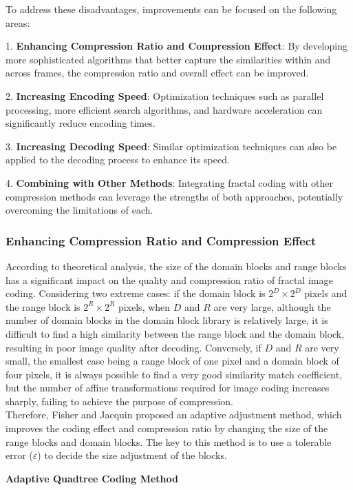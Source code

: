 \documentclass{article}
\begin{document}
To address these disadvantages, improvements can be focused on the following areas:

1. \textbf{Enhancing Compression Ratio and Compression Effect}: By developing more sophisticated algorithms that better capture the similarities within and across frames, the compression ratio and overall effect can be improved.

2. \textbf{Increasing Encoding Speed}: Optimization techniques such as parallel processing, more efficient search algorithms, and hardware acceleration can significantly reduce encoding times.

3. \textbf{Increasing Decoding Speed}: Similar optimization techniques can also be applied to the decoding process to enhance its speed.

4. \textbf{Combining with Other Methods}: Integrating fractal coding with other compression methods can leverage the strengths of both approaches, potentially overcoming the limitations of each.

\subsubsection{Enhancing Compression Ratio and Compression Effect}

According to theoretical analysis, the size of the domain blocks and range blocks has a significant impact on the quality and compression ratio of fractal image coding. Considering two extreme cases: if the domain block is \(2^D \times 2^D\) pixels and the range block is \(2^R \times 2^R\) pixels, when \(D\) and \(R\) are very large, although the number of domain blocks in the domain block library is relatively large, it is difficult to find a high similarity between the range block and the domain block, resulting in poor image quality after decoding. Conversely, if \(D\) and \(R\) are very small, the smallest case being a range block of one pixel and a domain block of four pixels, it is always possible to find a very good similarity match coefficient, but the number of affine transformations required for image coding increases sharply, failing to achieve the purpose of compression.\\
Therefore, Fisher and Jacquin proposed an adaptive adjustment method, which improves the coding effect and compression ratio by changing the size of the range blocks and domain blocks. The key to this method is to use a tolerable error (\( \varepsilon \)) to decide the size adjustment of the blocks.


\textbf{Adaptive Quadtree Coding Method}
\end{document}
